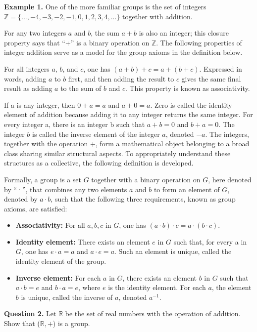 \documentclass{article}
\begin{document}
\textbf{Example 1.} One of the more familiar groups is the set of integers $\mathbb{Z} = \{. . . , -4, -3, -2, -1, 0, 1, 2, 3, 4, . . .\}$ together with addition.

For any two integers $a$ and $b$, the sum $a + b$ is also an integer; this closure property says that “+” is a binary operation on $\mathbb{Z}$. The following properties of integer addition serve as a model for the group axioms in the definition below.

For all integers $a$, $b$, and $c$, one has $(a + b) + c = a + (b + c)$. Expressed in words, adding $a$ to $b$ first, and then adding the result to $c$ gives the same final result as adding $a$ to the sum of $b$ and $c$. This property is known as associativity.

If a is any integer, then $0 + a = a$ and $a + 0 = a$. Zero is called the identity element of addition because adding it to any integer returns the same integer. For every integer a, there is an integer b such that $a + b = 0$ and $b + a = 0$. The integer $b$ is called the inverse element of the integer $a$, denoted $-a$. The integers, together with the operation +, form a mathematical object belonging to a broad class sharing similar structural aspects. To appropriately understand these structures as a collective, the following definition is developed.

Formally, a group is a set $G$ together with a binary operation on $G$, here denoted by “·”, that combines any two elements $a$ and $b$ to form an element of $G$, denoted by $a · b$, such that the following three requirements, known as group axioms, are satisfied:

\begin{itemize}
  \item \textbf{Associativity:} For all $a, b, c$ in $G$, one has $(a · b) · c = a · (b · c)$.
  \item \textbf{Identity element:} There exists an element $e$ in $G$ such that, for every a in $G$, one has $e · a = a$ and $a · e = a$. Such an element is unique, called the identity element of the group.
  \item \textbf{Inverse element:} For each $a$ in $G$, there exists an element $b$ in $G$ such that $a · b = e$ and $b · a = e$, where $e$ is the identity element. For each $a$, the element $b$ is unique, called the inverse of $a$, denoted $a^{-1}$.
\end{itemize}

\begin{tcolorbox}
  \textbf{Question 2.} Let $\mathbb{R}$ be the set of real numbers with the operation of addition. Show that ($\mathbb{R}, +$) is a group.
\end{tcolorbox}
\end{document}
